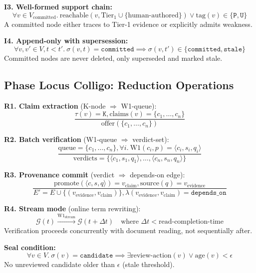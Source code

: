 \textbf{I3. Well-formed support chain:}
\begin{equation}
\forall v \in V_{\text{committed}}.\
  \text{reachable}(v, \text{Tier}_1 \cup \{\text{human-authored}\}) \lor
  \text{tag}(v) \in \{\mathtt{P}, \mathtt{U}\}
\end{equation}
A committed node either traces to Tier-1 evidence or explicitly admits weakness.

\textbf{I4. Append-only with supersession:}
\begin{equation}
\forall v, v' \in V, t < t'.\ \sigma(v, t) = \mathtt{committed} \implies
  \sigma(v, t') \in \{\mathtt{committed}, \mathtt{stale}\}
\end{equation}
Committed nodes are never deleted, only superseded and marked stale.

\subsection{Phase Locus Colligo: Reduction Operations}

\textbf{R1. Claim extraction} (K-node $\Rightarrow$ W1-queue):
\begin{equation}
\frac{\tau(v) = \mathtt{K}, \text{claims}(v) = \{c_1, \ldots, c_n\}}
     {\text{offer}(\{c_1, \ldots, c_n\})}
\end{equation}

\textbf{R2. Batch verification} (W1-queue $\Rightarrow$ verdict-set):
\begin{equation}
\frac{\text{queue} = \{c_1, \ldots, c_n\},
      \forall i.\ \text{W1}(c_i, p) = \langle c_i, s_i, q_i \rangle}
     {\text{verdicts} = \{\langle c_1, s_1, q_1 \rangle, \ldots,
      \langle c_n, s_n, q_n \rangle\}}
\end{equation}

\textbf{R3. Provenance commit} (verdict $\Rightarrow$ depends-on edge):
\begin{equation}
\frac{\text{promote}(\langle c, s, q \rangle) = v_{\text{claim}},
      \text{source}(q) = v_{\text{evidence}}}
     {E' = E \cup \{(v_{\text{evidence}}, v_{\text{claim}})\},
      \lambda(v_{\text{evidence}}, v_{\text{claim}}) = \mathtt{depends\_on}}
\end{equation}

\textbf{R4. Stream mode} (online term rewriting):
\begin{equation}
\mathcal{G}(t) \xrightarrow{\text{W1}_{\text{stream}}} \mathcal{G}(t+\Delta t)
\quad \text{where } \Delta t < \text{read-completion-time}
\end{equation}
Verification proceeds concurrently with document reading, not sequentially after.

\textbf{Seal condition:}
\begin{equation}
\forall v \in V.\ \sigma(v) = \mathtt{candidate} \implies
  \exists \text{review-action}(v) \lor
  \text{age}(v) < \epsilon
\end{equation}
No unreviewed candidate older than $\epsilon$ (stale threshold).


